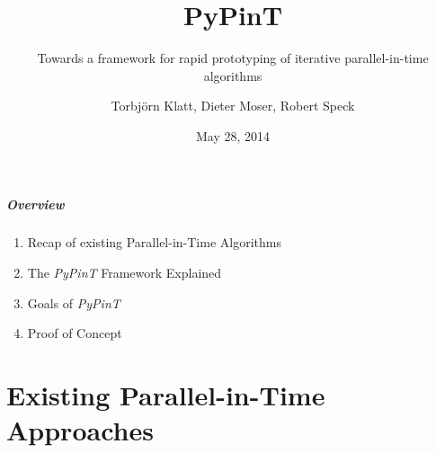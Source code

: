 \documentclass[%
  english,
  hyperref={pdfpagelabels=false},
  aspectratio=1610]{beamer}
\title{PyPinT}
\subtitle{Towards a framework for rapid prototyping of iterative parallel-in-time algorithms}
\author{Torbjörn Klatt, Dieter Moser, Robert Speck}
\institute{3rd Workshop on Parallel-in-Time Integration Methods}
\date{May 28, 2014}
\begin{document}
\maketitle

\begin{frame}
  \frametitle{Overview}
  \begin{enumerate}
    \item Recap of existing Parallel-in-Time Algorithms\\[2em]
    \item The \emph{PyPinT} Framework Explained\\[2em]
    \item Goals of \emph{PyPinT}\\[2em]
    \item Proof of Concept
  \end{enumerate}
\end{frame}


\part{Existing Parallel-in-Time Approaches}
\makepart
\end{document}
